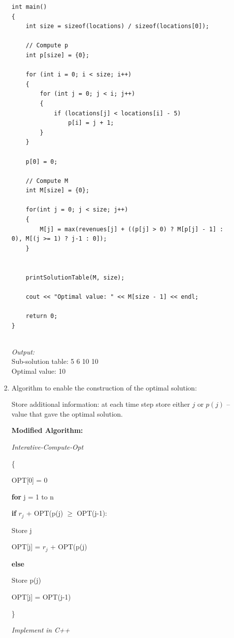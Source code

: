 \documentclass[11pts]{report}
\begin{document}
\begin{enumerate}
\begin{enumerate}
\begin{lstlisting}
int main() 
{ 
    int size = sizeof(locations) / sizeof(locations[0]);

    // Compute p
    int p[size] = {0};

    for (int i = 0; i < size; i++)
    {
        for (int j = 0; j < i; j++)
        {
            if (locations[j] < locations[i] - 5)
                p[i] = j + 1;
        }
    }

    p[0] = 0;

    // Compute M
    int M[size] = {0};

    for(int j = 0; j < size; j++)
    {
        M[j] = max(revenues[j] + ((p[j] > 0) ? M[p[j] - 1] : 0), M[(j >= 1) ? j-1 : 0]);
    }


    printSolutionTable(M, size);

    cout << "Optimal value: " << M[size - 1] << endl;

    return 0; 
} 


\end{lstlisting}

\textit{Output:}
\\Sub-solution table: 5 6 10 10
\\Optimal value: 10

\item Algorithm to enable the construction of the optimal solution:

Store additional information: at each time step store either $j$ or $p(j)$ – value that gave the optimal solution.

\par \textbf{Modified Algorithm:}
\par \textit{Interative-Compute-Opt}
\par \{
\par \quad OPT[0] = 0
\par \quad \textbf{for} j = 1 to n

\par \quad \textbf{if} $r_j$ + OPT(p(j) $\geq$ OPT(j-1):
\par \qquad Store j
\par \qquad OPT[j] = $r_j$ + OPT(p(j)
\par \quad \textbf{else} 
\par \qquad Store p(j)
\par \qquad OPT[j] = OPT(j-1)
\par \} 

\textit{Implement in C++}

\begin{lstlisting}




\end{lstlisting}
\end{enumerate}
\end{enumerate}
\end{document}
